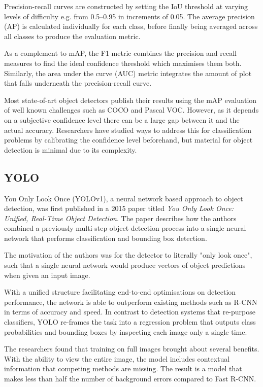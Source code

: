 \documentclass{thesis}
\begin{document}
Precision-recall curves are constructed by setting the IoU threshold at varying levels of difficulty e.g. from 0.5--0.95 in increments of 0.05. The average precision (AP) is calculated individually for each class, before finally being averaged across all classes to produce the evaluation metric.

As a complement to mAP, the F1 metric combines the precision and recall measures to find the ideal confidence threshold which maximises them both. Similarly,
the area under the curve (AUC) metric integrates the amount of plot that falls underneath the precision-recall curve.

Most state-of-art object detectors publish their results using the mAP evaluation of well known challenges such as COCO\cite{lin2015microsoft} and Pascal VOC\cite{Everingham15}. However, as it depends on a subjective confidence level there can be a large gap between it and the actual accuracy\cite{Peng2021}. Researchers have studied ways to address this for classification problems by calibrating the confidence level beforehand\cite{guo2017calibration}, but material for object detection is minimal due to its complexity.


\subsection{YOLO}

You Only Look Once (YOLOv1), a neural network based approach to object detection, was first published in a 2015 paper titled \textit{You Only Look Once: Unified, Real-Time Object Detection}. The paper describes how the authors combined a previously multi-step object detection process into a single neural network that performs classification and bounding box detection.

The motivation of the authors was for the detector to literally "only look once", such that a single neural network would produce vectors of object predictions when given an input image.

With a unified structure facilitating end-to-end optimisations on detection performance, the network is able to outperform existing methods such as R-CNN in terms of accuracy and speed\cite{yolov1}. In contrast to detection systems that re-purpose classifiers, YOLO re-frames the task into a regression problem that outputs class probabilities and bounding boxes by inspecting each image only a single time. 

The researchers found that training on full images brought about several benefits. With the ability to view the entire image, the model includes contextual information that competing methods are missing\cite{frcnn}. The result is a model that makes less than half the number of background errors compared to Fast R-CNN\cite{yolov1}.
\end{document}
